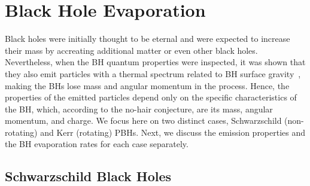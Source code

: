 \documentclass[aps,prd,reprint,twocolumn,preprintnumbers,floatfix,nofootinbib]{revtex4-1}
\begin{document}
\section{Black Hole Evaporation}
\label{sec:BH}

Black holes were initially thought to be eternal and were expected to increase their mass by accreating additional matter or even other black holes. Nevertheless, when the BH quantum properties were inspected, it was shown that they also emit particles with a thermal spectrum related to BH surface gravity~\cite{Hawking:1974rv,Hawking:1974sw}, making the BHs lose mass and angular momentum in the process. Hence, the properties of the emitted particles depend only on the specific characteristics of the BH, which, according to the no-hair conjecture, are its mass, angular momentum, and charge. We focus here on two distinct cases, Schwarzschild (non-rotating) and Kerr (rotating) PBHs. Next, we discuss the emission properties and the BH evaporation rates for each case separately.

\subsection{Schwarzschild Black Holes}
\end{document}
